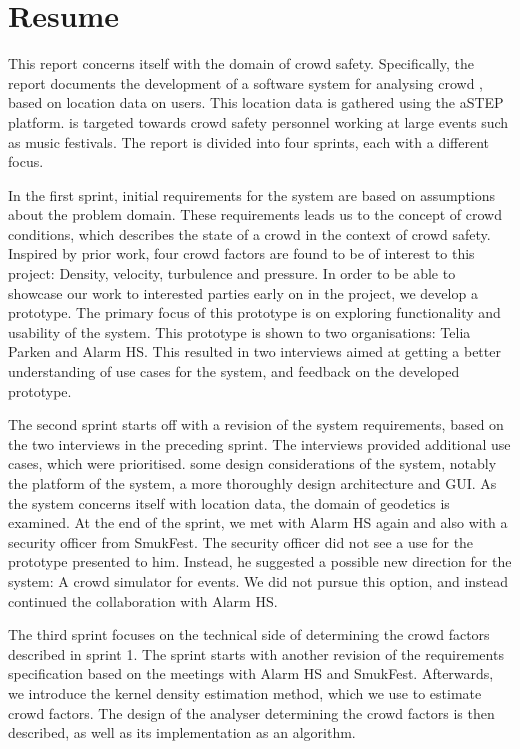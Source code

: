 \chapter*{Resume}

This report concerns itself with the domain of crowd safety. Specifically, the report documents the development of a software system for analysing crowd , based on location data on users. This location data is gathered using the aSTEP platform.  is targeted towards crowd safety personnel working at large events such as music festivals. The report is divided into four sprints, each with a different focus.

In the first sprint, initial requirements for the system are based on assumptions about the problem domain. These requirements leads us to the concept of crowd conditions, which describes the state of a crowd in the context of crowd safety. Inspired by prior work, four crowd factors are found to be of interest to this project: Density, velocity, turbulence and pressure. In order to be able to showcase our work to interested parties early on in the project, we develop a prototype. The primary focus of this prototype is on exploring functionality and usability of the system. This prototype is shown to two organisations: Telia Parken and Alarm HS. This resulted in two interviews aimed at getting a better understanding of use cases for the system, and feedback on the developed prototype.

The second sprint starts off with a revision of the system requirements, based on the two interviews in the preceding sprint. The interviews provided additional use cases, which were prioritised.  some design considerations of the system, notably the platform of the system, a more thoroughly design architecture and GUI. As the system concerns itself with location data, the domain of geodetics is examined. At the end of the sprint, we met with Alarm HS again and also with a security officer from SmukFest. The security officer did not see a use for the prototype presented to him. Instead, he suggested a possible new direction for the system: A crowd simulator for events. We did not pursue this option, and instead continued the collaboration with Alarm HS.

The third sprint focuses on the technical side of determining the crowd factors described in sprint 1. The sprint starts with another revision of the requirements specification based on the meetings with Alarm HS and SmukFest. Afterwards, we introduce the kernel density estimation method, which we use to estimate crowd factors. The design of the analyser determining the crowd factors is then described, as well as its implementation as an algorithm.

